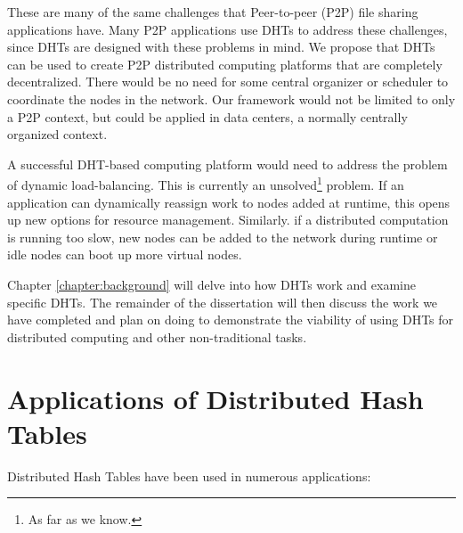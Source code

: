 These are many of the same challenges that Peer-to-peer (P2P) file sharing applications have.
Many P2P applications use DHTs to address these challenges, since DHTs are designed with these problems in mind.
We propose that DHTs can be used to create P2P distributed computing platforms that are completely decentralized.
There would be no need for some central organizer or scheduler to coordinate the nodes in the network.
Our framework would not be limited to only a P2P context, but could be applied in data centers, a normally centrally organized context.


A successful DHT-based computing platform would need to address the problem of dynamic load-balancing.
This is currently an unsolved\footnote{As far as we know.} problem. %
If an application can dynamically reassign work to nodes added at runtime, this opens up new options for resource management.
Similarly. if a distributed computation  is running too slow, new nodes can be added to the network during runtime or idle nodes can boot up more virtual nodes. %

Chapter \ref{chapter:background} will delve into how DHTs work and examine specific DHTs.
The remainder of the dissertation will then discuss the work we have completed and plan on doing to demonstrate the viability of using DHTs for distributed computing and other non-traditional tasks.




\section{Applications of Distributed Hash Tables}

Distributed Hash Tables have been used in numerous applications:

